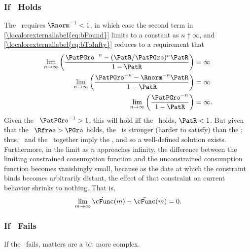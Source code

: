 \documentclass[../BufferStockTheory.tex]{subfiles}
\begin{document}
\subsubsection{If \FHWC~Holds}
The \FHWC~requires $\Rnorm^{-1} < 1$, in which case the second term in \eqref{\localorexternallabel{eq:bPound}} limits to a constant as $n \uparrow \infty$, and \eqref{\localorexternallabel{eq:bToInfty}} reduces to a requirement that
\begin{eqnarray*}
  \lim_{n \rightarrow \infty} \left(\frac{\PatPGro^{-n}-(\PatR/\PatPGro)^{n}\PatR}{1-\PatR}\right)  & = \infty
\\  \lim_{n \rightarrow \infty} \left(\frac{\PatPGro^{-n}-\Rnorm^{-n}\PatR}{1-\PatR}\right)  & = \infty
\\  \lim_{n \rightarrow \infty} \left(\frac{\PatPGro^{-n}}{1-\PatR}\right)  & = \infty.
\end{eqnarray*}
Given the \PFGIC~$\PatPGro^{-1}>1$, this will hold iff the \RIC~holds, $\PatR < 1$.  But given that the \FHWC~$\Rfree > \PGro$ holds, the \PFGIC~is stronger (harder to satisfy) than the \RIC; thus, \FHWC~and the \PFGIC~together imply the \RIC, and so a well-defined
solution exists.  Furthermore, in the limit as $n$ approaches
infinity, the difference between the limiting constrained consumption
function and the unconstrained consumption function becomes
vanishingly small, because as the date at which the constraint binds
becomes arbitrarily distant, the effect of that constraint on current
behavior shrinks to nothing.  That is,
\begin{align}
\lim_{m \rightarrow \infty}\grave{\cFunc}(m) - \bar{\cFunc}(m) = 0.
\end{align}


\subsubsection{If \FHWC~Fails}
If the \FHWC~fails, matters are a bit more complex.

\begin{comment}
As noted in the main text, the Finite Value Requirement for such a consumer
requires $\PatPGro < (\Rfree/\PGro)^{1/\CRRA}$,\footnote{A
  unique well-defined nondegenerate limiting consumption function can
  actually exist even if a nondegenerate value function does not.  But
  the parametric combinations required for this are somewhat peculiar
  (including both $\Rfree < 1$ and $\PGro < 1$); but we restrict our attention
  to the more useful and plausible cases with finite value.} which is stronger (holds
in strictly fewer circumstances) than the \PFGIC~condition $\PatPGro < 1$.
Thus, the \PFGIC~is an implication of $\cncl{\FHWC}$.
\end{comment}
\end{document}
